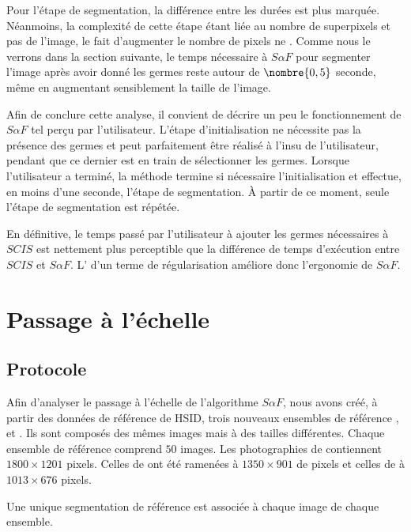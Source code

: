 Pour l'étape de segmentation, la différence entre les durées est plus marquée. Néanmoins, la complexité de cette étape étant liée au nombre de superpixels et pas  de l'image, le fait d'augmenter le nombre de pixels ne . Comme nous le verrons dans la section suivante, le temps nécessaire à $S \alpha F$ pour segmenter l'image après avoir donné les germes reste autour de $\nombre{0,5}$ seconde, même en augmentant sensiblement la taille de l'image. 

Afin de conclure cette analyse, il convient de décrire un peu le fonctionnement de $S \alpha F$ tel  perçu par l'utilisateur. L'étape d'initialisation ne nécessite pas la présence des germes et peut parfaitement être réalisé à l'insu de l'utilisateur, pendant que ce dernier est en train de sélectionner les germes. Lorsque l'utilisateur a terminé, la méthode termine si nécessaire l'initialisation et effectue, en moins d'une seconde, l'étape de segmentation. À partir de ce moment, seule l'étape de segmentation est répétée. 

En définitive, le temps passé par l'utilisateur à ajouter les germes nécessaires à $SCIS$ est nettement plus perceptible que la différence de temps d'exécution entre $SCIS$ et $S \alpha F$. L' d'un terme de régularisation améliore donc l'ergonomie de $S \alpha F$.

\section{Passage à l'échelle}

\subsection{Protocole}
Afin d'analyser le passage à l'échelle de l'algorithme $S \alpha F$, nous avons créé, à partir des données de référence de HSID, trois nouveaux ensembles de référence ,  et . Ils sont composés des mêmes images  mais à des tailles différentes. Chaque ensemble de référence comprend $50$ images. Les photographies de  contiennent $1800 \times 1201$ pixels. Celles de  ont été ramenées à $1350 \times 901$ de pixels et celles de  à $1013 \times 676$ pixels.  

Une unique segmentation de référence est associée à chaque image de chaque ensemble.  

